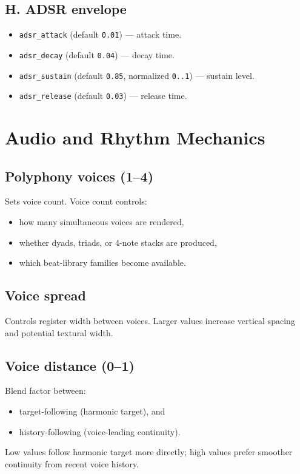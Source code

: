 \documentclass[11pt,a4paper]{article}
\begin{document}
\subsection*{H. ADSR envelope}
\begin{itemize}
  \item \texttt{adsr\_attack} (default \texttt{0.01}) --- attack time.
  \item \texttt{adsr\_decay} (default \texttt{0.04}) --- decay time.
  \item \texttt{adsr\_sustain} (default \texttt{0.85}, normalized \texttt{0..1}) --- sustain level.
  \item \texttt{adsr\_release} (default \texttt{0.03}) --- release time.
\end{itemize}

\section{Audio and Rhythm Mechanics}
\subsection*{Polyphony voices (1--4)}
Sets voice count. Voice count controls:
\begin{itemize}
  \item how many simultaneous voices are rendered,
  \item whether dyads, triads, or 4-note stacks are produced,
  \item which beat-library families become available.
\end{itemize}

\subsection*{Voice spread}
Controls register width between voices. Larger values increase vertical spacing and potential textural width.

\subsection*{Voice distance (0--1)}
Blend factor between:
\begin{itemize}
  \item target-following (harmonic target), and
  \item history-following (voice-leading continuity).
\end{itemize}
Low values follow harmonic target more directly; high values prefer smoother continuity from recent voice history.
\end{document}
